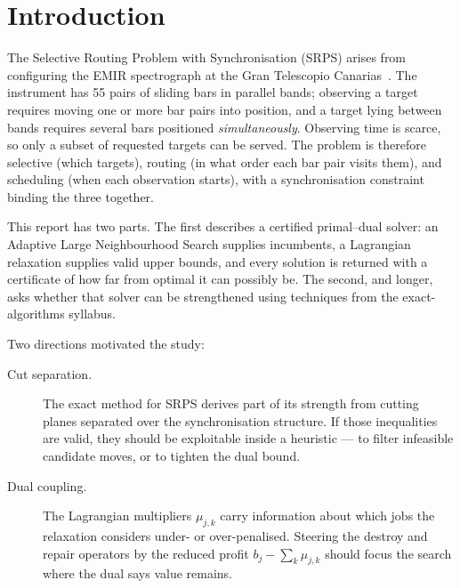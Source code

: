 \documentclass[11pt,a4paper]{article}
\newcommand{\pp}{\,pp}
\begin{document}
\begin{abstract}
A ceiling argument computed from the solver's own gap distribution bounds
\emph{any} technique aimed at the certified gap at $0.1136\pp$ on average and
$0.0087\pp$ at the median---below the run-to-run variance of the experiments built
to detect it---and every gap-directed technique tested was absorbed by it. The two
aimed at runtime were not so bounded, and one delivered: parallel evaluation of
the per-processor subproblems is $1.42\times$ faster with numerically identical bounds (floored certificates match exactly).
Beyond the negative results we extract two methodological lessons: mechanism
\emph{activation} is not evidence of mechanism \emph{effect}, and a verdict
measured at one computational budget can reverse at another---in both directions.
\end{abstract}

\tableofcontents

\section{Introduction}\label{sec:intro}

The Selective Routing Problem with Synchronisation (SRPS) arises from configuring
the EMIR spectrograph at the Gran Telescopio Canarias~\cite{RieraLedesma2021SRPS}.
The instrument has 55 pairs of sliding bars in parallel bands; observing a target
requires moving one or more bar pairs into position, and a target lying between
bands requires several bars positioned \emph{simultaneously}. Observing time is
scarce, so only a subset of requested targets can be served. The problem is
therefore selective (which targets), routing (in what order each bar pair visits
them), and scheduling (when each observation starts), with a synchronisation
constraint binding the three together.

This report has two parts. The first describes a certified primal--dual solver:
an Adaptive Large Neighbourhood Search supplies incumbents, a Lagrangian
relaxation supplies valid upper bounds, and every solution is returned with a
certificate of how far from optimal it can possibly be. The second, and longer,
asks whether that solver can be strengthened using techniques from the
exact-algorithms syllabus.

Two directions motivated the study:

\begin{description}
  \item[Cut separation.] The exact method for SRPS derives part of its
    strength from cutting planes separated over the synchronisation structure. If
    those inequalities are valid, they should be exploitable inside a heuristic
    --- to filter infeasible candidate moves, or to tighten the dual bound.
  \item[Dual coupling.] The Lagrangian multipliers $\mu_{j,k}$ carry
    information about which jobs the relaxation considers under- or
    over-penalised. Steering the destroy and repair operators by the reduced
    profit $b_j-\sum_k \mu_{j,k}$ should focus the search where the dual says
    value remains.
\end{description}
\end{document}
